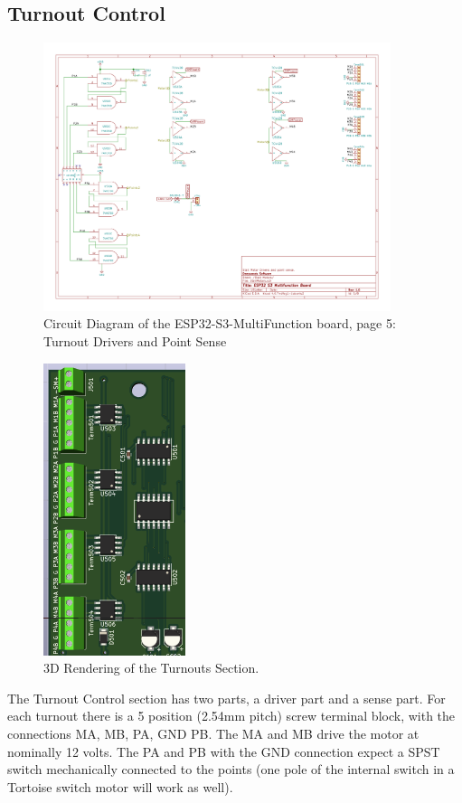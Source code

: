 \subsection{Turnout Control} 
\begin{figure}[hbpt]\begin{centering}%
\includegraphics[width=4in]{ESP32-S3-MultiFunction-5.pdf}
\caption{Circuit Diagram of the ESP32-S3-MultiFunction board, page 5: Turnout 
Drivers and Point Sense}
\end{centering}\end{figure}
\begin{figure}[hbpt]\begin{centering}%
\includegraphics{ESP32-S3-MultiFunction-top3D-Turnouts.png}
\caption{3D Rendering of the Turnouts Section.}
\end{centering}\end{figure}

The Turnout Control section has two parts, a driver part and a sense part.  
For each turnout there is a 5 position (2.54mm pitch) screw terminal block, 
with the connections MA, MB, PA, GND PB.   The MA and MB drive the motor at 
nominally 12 volts.  The PA and PB with the GND connection expect a SPST 
switch mechanically connected to the points (one pole of the internal switch 
in a Tortoise switch motor will work as well).

